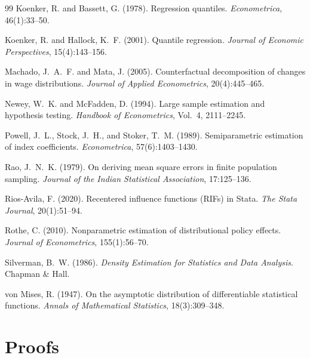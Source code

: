 \documentclass[12pt,a4paper]{article}
\theoremstyle{definition}
\begin{document}
\begin{thebibliography}{99}
Koenker, R. and Bassett, G. (1978). Regression quantiles.
\emph{Econometrica}, 46(1):33--50.

Koenker, R. and Hallock, K.~F. (2001). Quantile regression.
\emph{Journal of Economic Perspectives}, 15(4):143--156.

Machado, J.~A.~F. and Mata, J. (2005). Counterfactual decomposition of
changes in wage distributions. \emph{Journal of Applied Econometrics},
20(4):445--465.

Newey, W.~K. and McFadden, D. (1994). Large sample estimation and
hypothesis testing. \emph{Handbook of Econometrics}, Vol.~4, 2111--2245.

Powell, J.~L., Stock, J.~H., and Stoker, T.~M. (1989). Semiparametric
estimation of index coefficients. \emph{Econometrica}, 57(6):1403--1430.

Rao, J.~N.~K. (1979). On deriving mean square errors in finite population
sampling. \emph{Journal of the Indian Statistical Association},
17:125--136.

Rios-Avila, F. (2020). Recentered influence functions (RIFs) in Stata.
\emph{The Stata Journal}, 20(1):51--94.

Rothe, C. (2010). Nonparametric estimation of distributional policy
effects. \emph{Journal of Econometrics}, 155(1):56--70.

Silverman, B.~W. (1986). \emph{Density Estimation for Statistics and Data
Analysis}. Chapman \& Hall.

von Mises, R. (1947). On the asymptotic distribution of differentiable
statistical functions. \emph{Annals of Mathematical Statistics},
18(3):309--348.

\end{thebibliography}

\appendix

\section{Proofs}
\label{app:proofs}
\end{document}
